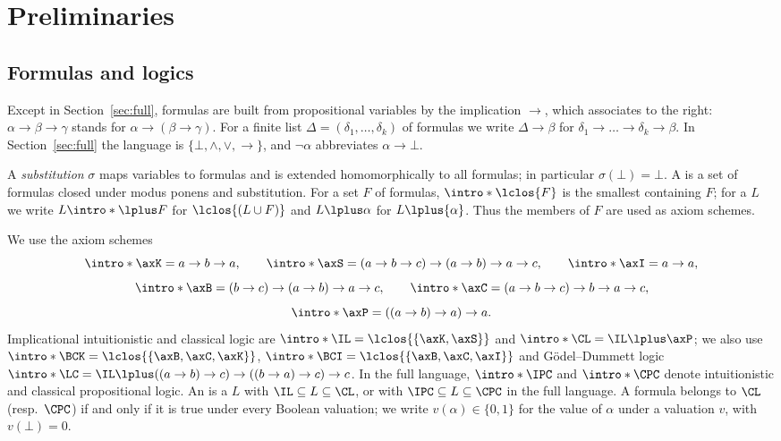 \section{Preliminaries}\label{sec:prelim}

\subsection{Formulas and logics}

Except in Section~\ref{sec:full}, formulas are built from propositional
variables by the implication $\to$, which associates to the right:
$\alpha\to\beta\to\gamma$ stands for $\alpha\to(\beta\to\gamma)$. For a
finite list $\Delta=(\delta_1,\dots,\delta_k)$ of formulas we write
$\Delta\to\beta$ for $\delta_1\to\dots\to\delta_k\to\beta$. In
Section~\ref{sec:full} the language is $\{\bot,\wedge,\vee,\to\}$, and
$\neg\alpha$ abbreviates $\alpha\to\bot$.

\AP A \emph{substitution} $\sigma$ maps variables to formulas and is
extended homomorphically to all formulas; in particular $\sigma(\bot)=\bot$.
A  is a set of formulas closed under modus ponens and
substitution. For a set $F$ of formulas, $\intro*\lclos{F}$ is the smallest
 containing $F$; for a  $L$ we write
$L\intro*\lplus F$ for $\lclos{(L\cup F)}$ and $L\lplus\alpha$ for
$L\lplus\{\alpha\}$. Thus the members of $F$ are used as axiom schemes.

\AP We use the axiom schemes
\[
\intro*\axK=a\to b\to a,\qquad
\intro*\axS=(a\to b\to c)\to(a\to b)\to a\to c,\qquad
\intro*\axI=a\to a,
\]
\[
\intro*\axB=(b\to c)\to(a\to b)\to a\to c,\qquad
\intro*\axC=(a\to b\to c)\to b\to a\to c,
\]
\[
\intro*\axP=((a\to b)\to a)\to a .
\]
\AP Implicational intuitionistic and classical logic are
$\intro*\IL=\lclos{\{\axK,\axS\}}$ and $\intro*\CL=\IL\lplus\axP$;
we also use $\intro*\BCK=\lclos{\{\axB,\axC,\axK\}}$,
$\intro*\BCI=\lclos{\{\axB,\axC,\axI\}}$ and Gödel--Dummett
logic~\cite{Dum59} $\intro*\LC=\IL\lplus((a\to b)\to c)\to((b\to a)\to c)\to c$. In the full language,
$\intro*\IPC$ and $\intro*\CPC$ denote intuitionistic and classical
propositional logic. An  is a  $L$ with
$\IL\subseteq L\subseteq\CL$, or with $\IPC\subseteq L\subseteq\CPC$ in the
full language. A formula belongs to $\CL$ (resp.\ $\CPC$) if and only if it
is true under every Boolean valuation; we write $v(\alpha)\in\{0,1\}$ for
the value of $\alpha$ under a valuation $v$, with $v(\bot)=0$.

